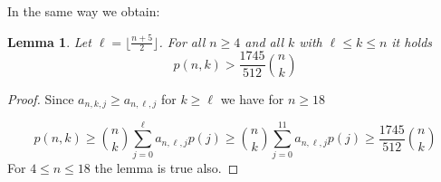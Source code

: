 \documentclass[12pt]{amsart}
\newtheorem{lem}[thm]{Lemma}
\theoremstyle{definition}
\theoremstyle{remark}
\begin{document}
In the same way we obtain:

\begin{lem}\label{gr}
Let $\ell=\lfloor \frac{n+5}{2} \rfloor$.
For all $n\ge 4$ and all $k$ with $\ell\le k\le n$ it holds
\begin{equation*}
p(n,k)>\frac{1745}{512}\binom{n}{k}  
\end{equation*}
\end{lem}

\begin{proof}
Since $a_{n,k,j}\ge a_{n,\ell,j}$ for $k\ge \ell$ we have
for $n\ge 18$

\begin{equation*}
p(n,k)\ge \binom{n}{k}\sum_{j=0}^\ell a_{n,\ell,j}p(j)\ge 
\binom{n}{k} \sum_{j=0}^{11} a_{n,\ell,j}p(j)\ge \frac{1745}{512}\binom{n}{k}
\end{equation*}
For $4\le n\le 18$ the lemma is true also. 
\end{proof}
\end{document}
